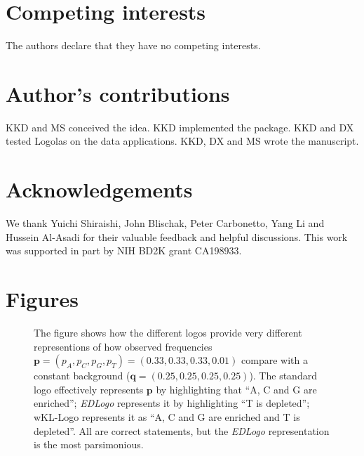 \documentclass{bmcart}
\def\p{{\mathbf p}}
\def\q{{\mathbf q}}
\begin{document}
\begin{backmatter}




\section*{Competing interests}
  The authors declare that they have no competing interests.

\section*{Author's contributions}
 KKD and MS conceived the idea.  KKD implemented the package. KKD and DX tested Logolas on the data applications. KKD, DX and MS wrote the manuscript. 

\section*{Acknowledgements}
We thank Yuichi Shiraishi, John Blischak, Peter Carbonetto, Yang Li and Hussein Al-Asadi for their valuable feedback and helpful discussions. This work was supported in part by NIH BD2K grant CA198933.
  
\section*{Figures}

\begin{figure}[h!]
\caption{ 
The figure shows how the different logos provide very different representions of how observed frequencies $\p = (p_A, p_C, p_G, p_T) = (0.33, 0.33, 0.33, 0.01)$ compare with a constant background ($\q=(0.25,0.25,0.25,0.25)$). The standard logo effectively represents $\p$ by highlighting that ``A, C and G are enriched''; \textit{EDLogo} represents it by highlighting ``T is depleted''; wKL-Logo represents it as ``A, C and G are enriched and T is depleted''. All are correct statements, but the \textit{EDLogo} representation is the most parsimonious.}
\label{fig:fig0}
\end{figure}


\end{backmatter}
\end{document}
